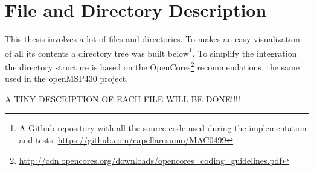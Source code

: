 \chapter{File and Directory Description}
\label{cap:apendiceB}

This thesis involves a lot of files and directories. To makes an easy visualization of all its contents a directory tree was built below\footnote{ A Github repository with all the source code used during the implementation and tests. \url{https://github.com/capellaresumo/MAC0499}}. To simplify the integration the directory structure is based on the OpenCores\footnote{\url{http://cdn.opencores.org/downloads/opencores_coding_guidelines.pdf}} recommendations, the same used in the openMSP430 project.

A TINY DESCRIPTION OF EACH FILE WILL BE DONE!!!!

